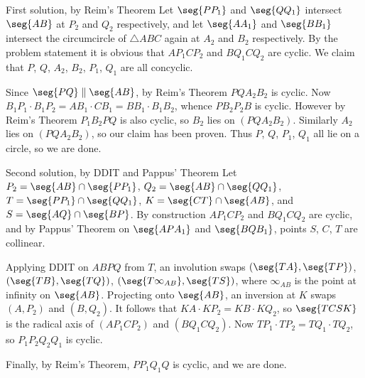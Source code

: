 \begin{customenv}{First solution, by Reim's Theorem}
    Let $\seg{PP_1}$ and $\seg{QQ_1}$ intersect $\seg{AB}$ at $P_2$ and $Q_2$ respectively, and let $\seg{AA_1}$ and $\seg{BB_1}$ intersect the circumcircle of $\triangle ABC$ again at $A_2$ and $B_2$ respectively. By the problem statement it is obvious that $AP_1CP_2$ and $BQ_1CQ_2$ are cyclic. We claim that $P$, $Q$, $A_2$, $B_2$, $P_1$, $Q_1$ are all concyclic.

    Since $\seg{PQ}\parallel\seg{AB}$, by Reim's Theorem $PQA_2B_2$ is cyclic. Now $B_1P_1\cdot B_1P_2=AB_1\cdot CB_1=BB_1\cdot B_1B_2$, whence $PB_2P_2B$ is cyclic. However by Reim's Theorem $P_1B_2PQ$ is also cyclic, so $B_2$ lies on $(PQA_2B_2)$. Similarly $A_2$ lies on $(PQA_2B_2)$, so our claim has been proven. Thus $P$, $Q$, $P_1$, $Q_1$ all lie on a circle, so we are done.
\end{customenv}
\begin{customenv}{Second solution, by DDIT and Pappus' Theorem}
    Let $P_2=\seg{AB}\cap\seg{PP_1}$, $Q_2=\seg{AB}\cap\seg{QQ_1}$, $T=\seg{PP_1}\cap\seg{QQ_1}$, $K=\seg{CT}\cap\seg{AB}$, and $S=\seg{AQ}\cap\seg{BP}$. By construction $AP_1CP_2$ and $BQ_1CQ_2$ are cyclic, and by Pappus' Theorem on $\seg{APA_1}$ and $\seg{BQB_1}$, points $S$, $C$, $T$ are collinear.

    Applying DDIT on $ABPQ$ from $T$, an involution swaps $(\seg{TA},\seg{TP})$, $(\seg{TB},\seg{TQ})$, $(\seg{T\infty_{AB}},\seg{TS})$, where $\infty_{AB}$ is the point at infinity on $\seg{AB}$. Projecting onto $\seg{AB}$, an inversion at $K$ swaps $(A,P_2)$ and $(B,Q_2)$. It follows that $KA\cdot KP_2=KB\cdot KQ_2$, so $\seg{TCSK}$ is the radical axis of $(AP_1CP_2)$ and $(BQ_1CQ_2)$. Now $TP_1\cdot TP_2=TQ_1\cdot TQ_2$, so $P_1P_2Q_2Q_1$ is cyclic.

    Finally, by Reim's Theorem, $PP_1Q_1Q$ is cyclic, and we are done.
\end{customenv}

